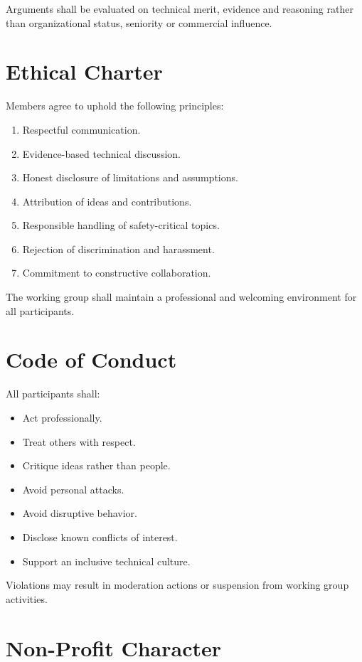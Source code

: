 \documentclass[11pt,a4paper]{article}
\begin{document}
Arguments shall be evaluated on technical merit, evidence and reasoning
rather than organizational status, seniority or commercial influence.

\section{Ethical Charter}

Members agree to uphold the following principles:

\begin{enumerate}
\item Respectful communication.
\item Evidence-based technical discussion.
\item Honest disclosure of limitations and assumptions.
\item Attribution of ideas and contributions.
\item Responsible handling of safety-critical topics.
\item Rejection of discrimination and harassment.
\item Commitment to constructive collaboration.
\end{enumerate}

The working group shall maintain a professional and welcoming
environment for all participants.

\section{Code of Conduct}

All participants shall:

\begin{itemize}
\item Act professionally.
\item Treat others with respect.
\item Critique ideas rather than people.
\item Avoid personal attacks.
\item Avoid disruptive behavior.
\item Disclose known conflicts of interest.
\item Support an inclusive technical culture.
\end{itemize}

Violations may result in moderation actions or suspension from working
group activities.

\section{Non-Profit Character}
\end{document}

